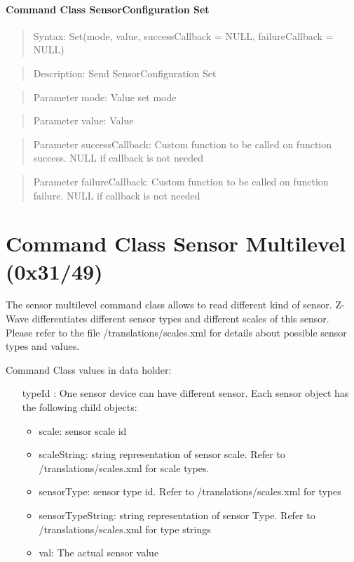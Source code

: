 \paragraph {Command Class SensorConfiguration Set}
\begin{quote} Syntax: Set(mode, value, successCallback = NULL, failureCallback = NULL)\end{quote}
\begin{quote} Description: Send SensorConfiguration Set\end{quote}
\begin{quote} Parameter mode: Value set mode\end{quote}
\begin{quote} Parameter value: Value\end{quote}
\begin{quote}  Parameter successCallback: Custom function to be called on function success. NULL if callback is not needed\end{quote}
\begin{quote}  Parameter failureCallback: Custom function to be called on function failure. NULL if callback is not needed\end{quote}
 
\section{Command Class Sensor Multilevel (0x31/49)}

The sensor multilevel command class allows to read different kind of sensor. Z-Wave differentiates 
different sensor types and different scales of this sensor. Please refer to the file /translations/scales.xml 
for details about possible sensor types and values.

Command Class values in data holder:
\begin{itemize}

\item [typeId]: One sensor device can have different sensor. Each sensor object has the following child objects:
\begin{itemize}
\item scale: sensor scale id
\item scaleString: string representation of sensor scale. Refer to  /translations/scales.xml for scale types. 
\item sensorType: sensor type id. Refer to  /translations/scales.xml for types
\item sensorTypeString: string representation of sensor Type. Refer to  /translations/scales.xml for type strings
\item val: The actual sensor value
\end{itemize}
\end{itemize}

